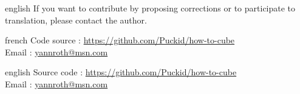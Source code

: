 \documentclass[0_Main.tex]{subfiles}
\begin{document}
\begin{shownto}{english}
If you want to contribute by proposing corrections or to participate to translation, please contact the author.
\end{shownto}

\begin{shownto}{french}
	Code source : \href{https://github.com/Puckid/how-to-cube}{https://github.com/Puckid/how-to-cube} \\
	Email : \href{mailto:yannroth@msn.com}{yannroth@msn.com}
\end{shownto}

\begin{shownto}{english}
	Source code : \href{https://github.com/Puckid/how-to-cube}{https://github.com/Puckid/how-to-cube} \\
	Email : \href{mailto:yannroth@msn.com}{yannroth@msn.com}
\end{shownto}
\end{document}
